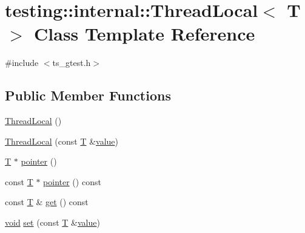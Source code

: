 \hypertarget{classtesting_1_1internal_1_1ThreadLocal}{\section{testing\-:\-:internal\-:\-:Thread\-Local$<$ T $>$ Class Template Reference}
\label{classtesting_1_1internal_1_1ThreadLocal}
}


{\ttfamily \#include $<$ts\-\_\-gtest.\-h$>$}

\subsection*{Public Member Functions}
\begin{DoxyCompactItemize}
\item 
\hyperlink{classtesting_1_1internal_1_1ThreadLocal_a106f3a3ad15d08f95f9887105d2a1af5}{Thread\-Local} ()
\item 
\hyperlink{classtesting_1_1internal_1_1ThreadLocal_a85610bdfdbc93a4c56215e0aad7da870}{Thread\-Local} (const \hyperlink{calib3d_8hpp_a3efb9551a871ddd0463079a808916717}{T} \&\hyperlink{highgui__c_8h_ad4670c92695d4327c21292905a803901}{value})
\item 
\hyperlink{calib3d_8hpp_a3efb9551a871ddd0463079a808916717}{T} $\ast$ \hyperlink{classtesting_1_1internal_1_1ThreadLocal_a882f57fed4b074de83693c0c0fe62858}{pointer} ()
\item 
const \hyperlink{calib3d_8hpp_a3efb9551a871ddd0463079a808916717}{T} $\ast$ \hyperlink{classtesting_1_1internal_1_1ThreadLocal_af4b33c12fd2da7d43d8654feccca77f7}{pointer} () const 
\item 
const \hyperlink{calib3d_8hpp_a3efb9551a871ddd0463079a808916717}{T} \& \hyperlink{classtesting_1_1internal_1_1ThreadLocal_a9cfa47ae6e9e8c19fe8782e2e9c1b13e}{get} () const 
\item 
\hyperlink{legacy_8hpp_a8bb47f092d473522721002c86c13b94e}{void} \hyperlink{classtesting_1_1internal_1_1ThreadLocal_ab5ebc7ba07426cef7167afa2a7707eb4}{set} (const \hyperlink{calib3d_8hpp_a3efb9551a871ddd0463079a808916717}{T} \&\hyperlink{highgui__c_8h_ad4670c92695d4327c21292905a803901}{value})
\end{DoxyCompactItemize}


